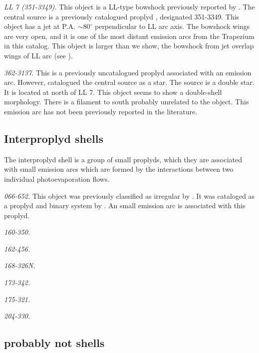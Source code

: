 \documentclass[iop, apj]{emulateapj}
\begin{document}
\textit{LL 7 (351-3349).} This object is a LL-type bowshock previously reported by \citet{Bally:2001a}. The central source is a previously catalogued proplyd \citep{Ricci:2008a}, designated 351-3349. This object has a jet at P.A. $\sim 80^{\circ}$ perpendicular to LL arc axis. The  bowshock  wings are very open, and it is one of the most distant emission arcs from the Trapezium in this catalog. This object is larger than we show, the bowshock from jet overlap wings of LL arc (see \citealp{Bally:2001a}).   

\textit{362-3137.} This is a previously uncatalogued proplyd associated with an emission arc. However, \citet{Da-Rio:2009a} catalogued the central source as a star. The source is a double star. It is located at north of LL 7. This object seems to show a double-shell morphology. There is a filament to south probably unrelated to the object. This emission arc has not been previously reported in the literature. 


\clearpage
\subsection{Interproplyd shells}
\label{sec:interproplyd-group}



The interproplyd shell is a  group of small proplyds, which they are associated with small emission arcs which are formed by the interactions between two individual photoevaporation flows.

\textit{066-652.} This object was previously classified as irregular by \citet{ODell:1996a}. It  was  cataloged as a proplyd and binary system by \citet{Ricci:2008a}. An small emission arc is associated with this proplyd. 
    
\textit{160-350.}

\textit{162-456.}

\textit{168-326N.}

\textit{173-342.}

\textit{175-321.}

\textit{204-330.}

\clearpage
\subsection{probably not shells}
\label{sec:problematic-group}



\label{sec:notshell}
\end{document}
